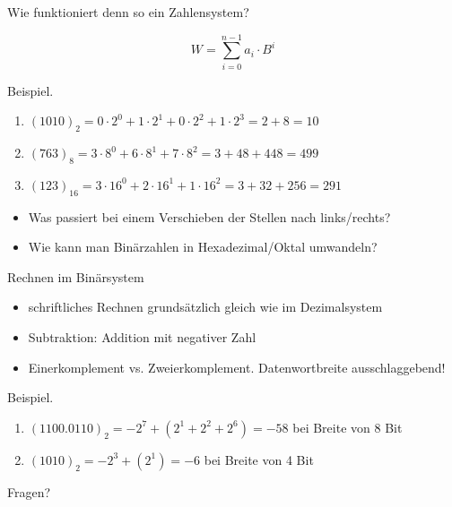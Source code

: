 \documentclass[
  german,            %
  aspectratio=169,    %
]{tumbeamer}
\begin{document}
\begin{frame}[c]{Wie funktioniert denn so ein Zahlensystem?}{}

  \begin{equation}
    W=\sum_{i=0}^{n-1}a_i\cdot B^i
  \end{equation}
  \begin{block}{Beispiel.}
    \begin{enumerate}
      \item $(1010)_2 = 0\cdot 2^0+1\cdot 2^1+0\cdot 2^2+1\cdot 2^3=2+8=10$
      \item $(763)_8 = 3\cdot 8^0+6\cdot 8^1+7\cdot 8^2=3+48+448=499$
      \item $(123)_{16} = 3\cdot 16^0+2\cdot 16^1+1\cdot 16^2=3+32+256=291$
    \end{enumerate}
  \end{block}
  \hspace{1cm}
  \begin{itemize}
    \item Was passiert bei einem Verschieben der Stellen nach links/rechts?
    \item Wie kann man Binärzahlen in Hexadezimal/Oktal umwandeln?
  \end{itemize}
\end{frame}

\begin{frame}[c]{Rechnen im Binärsystem}{}
  \begin{itemize}
    \item schriftliches Rechnen grundsätzlich gleich wie im Dezimalsystem
    \item Subtraktion: Addition mit negativer Zahl
    \item Einerkomplement vs. Zweierkomplement. Datenwortbreite ausschlaggebend!
  \end{itemize}
  \vfill{}
  \begin{block}{Beispiel.}
    \begin{enumerate}
      \item $(1100.0110)_2 = -2^7+(2^1+2^2+2^6)=-58$ bei Breite von 8 Bit
      \item $(1010)_2 = -2^3 + (2^1) = -6$ bei Breite von 4 Bit
    \end{enumerate}
  \end{block}

\end{frame}

\begin{frame}[c]{}{}
  \begin{center}
    \LARGE Fragen?
  \end{center}
\end{frame}
\end{document}
